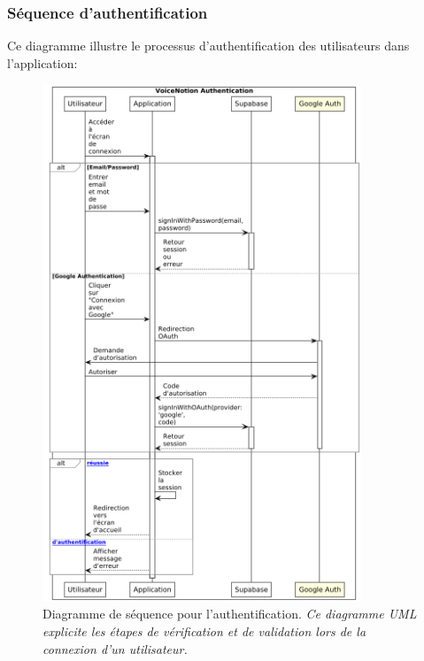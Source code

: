    \subsubsection{Séquence d'authentification}
    
    Ce diagramme illustre le processus d'authentification des utilisateurs dans l'application:
    
        \begin{figure}[htbp]
        \centering
        \includegraphics[width=0.85\textwidth]{assets/docs/voicenotion_auth_sequence.png}
        \caption{Diagramme de séquence pour l'authentification. \newline\textit{Ce diagramme UML explicite les étapes de vérification et de validation lors de la connexion d'un utilisateur.}}
        \label{fig:sequence_auth}
    \end{figure}
    
